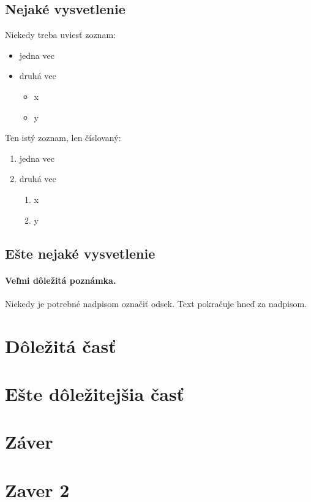 \documentclass[10pt,twoside,slovak,a4paper, colorinlistoftodos]{article}
\begin{document}
\subsection{Nejaké vysvetlenie} \label{ina:nejake}

Niekedy treba uviesť zoznam:

\begin{itemize}
\item jedna vec
\item druhá vec
	\begin{itemize}
	\item x
	\item y
	\end{itemize}
\end{itemize}

Ten istý zoznam, len číslovaný:

\begin{enumerate}
\item jedna vec
\item druhá vec
	\begin{enumerate}
	\item x
	\item y
	\end{enumerate}
\end{enumerate}


\subsection{Ešte nejaké vysvetlenie} \label{ina:este}

\paragraph{Veľmi dôležitá poznámka.}
Niekedy je potrebné nadpisom označiť odsek. Text pokračuje hneď za nadpisom.



\section{Dôležitá časť} \label{dolezita}




\section{Ešte dôležitejšia časť} \label{dolezitejsia}




\section{Záver} \label{zaver} %



\section{Zaver 2}





 
\end{document}
